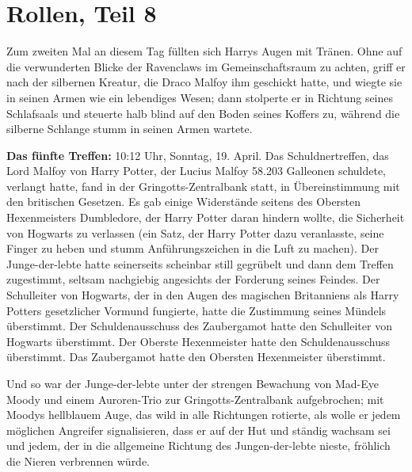 \chapter{Rollen, Teil 8}

Zum zweiten Mal an diesem Tag füllten sich Harrys Augen mit Tränen. Ohne auf die
verwunderten Blicke der Ravenclaws im Gemeinschaftsraum zu achten, griff er nach
der silbernen Kreatur, die Draco Malfoy ihm geschickt hatte, und wiegte sie in
seinen Armen wie ein lebendiges Wesen; dann stolperte er in Richtung seines
Schlafsaals und steuerte halb blind auf den Boden seines Koffers zu, während die
silberne Schlange stumm in seinen Armen wartete.

\textbf{Das fünfte Treffen:} 10:12 Uhr, Sonntag, 19. April. Das
Schuldnertreffen, das Lord Malfoy von Harry Potter, der Lucius Malfoy 58.203
Galleonen schuldete, verlangt hatte, fand in der Gringotts-Zentralbank statt, in
Übereinstimmung mit den britischen Gesetzen. Es gab einige Widerstände seitens
des Obersten Hexenmeisters Dumbledore, der Harry Potter daran hindern wollte,
die Sicherheit von Hogwarts zu verlassen (ein Satz, der Harry Potter dazu
veranlasste, seine Finger zu heben und stumm Anführungszeichen in die Luft zu
machen). Der Junge-der-lebte hatte seinerseits scheinbar still gegrübelt und
dann dem Treffen zugestimmt, seltsam nachgiebig angesichts der Forderung seines
Feindes. Der Schulleiter von Hogwarts, der in den Augen des magischen
Britanniens als Harry Potters gesetzlicher Vormund fungierte, hatte die
Zustimmung seines Mündels überstimmt. Der Schuldenausschuss des Zaubergamot
hatte den Schulleiter von Hogwarts überstimmt. Der Oberste Hexenmeister hatte
den Schuldenausschuss überstimmt. Das Zaubergamot hatte den Obersten
Hexenmeister überstimmt.

Und so war der Junge-der-lebte unter der strengen Bewachung von Mad-Eye Moody
und einem Auroren-Trio zur Gringotts-Zentralbank aufgebrochen; mit Moodys
hellblauem Auge, das wild in alle Richtungen rotierte, als wolle er jedem
möglichen Angreifer signalisieren, dass er auf der Hut und ständig wachsam sei
und jedem, der in die allgemeine Richtung des Jungen-der-lebte nieste, fröhlich
die Nieren verbrennen würde.

